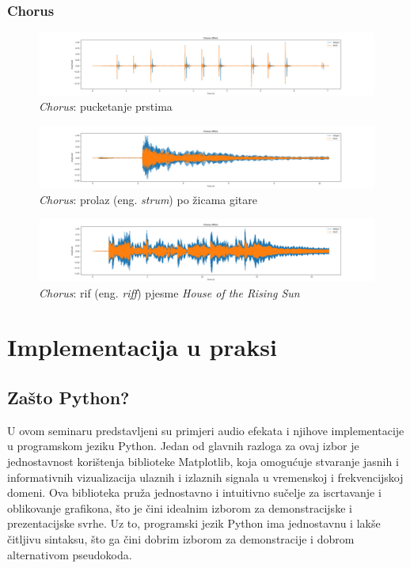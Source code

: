 \documentclass[times, utf8, seminar, numeric]{fer}
\begin{document}
\subsection{Chorus}
\begin{figure}[!htb]
	\centerline{\includegraphics[width=1.75\textwidth]{chorus_finger-snapping.png}}
	\caption{\textit{Chorus}: pucketanje prstima}
	\label{fig}
\end{figure}
\begin{figure}[!htb]
	\centerline{\includegraphics[width=1.75\textwidth]{chorus_strum.png}}
	\caption{\textit{Chorus}: prolaz (eng. \textit{strum}) po žicama gitare}
	\label{fig}
\end{figure}
\begin{figure}[!htb]
	\centerline{\includegraphics[width=1.75\textwidth]{chorus_rising-sun.png}}
	\caption{\textit{Chorus}: rif (eng. \textit{riff}) pjesme \textit{House of the Rising Sun}}
	\label{fig}
\end{figure}

\chapter{Implementacija u praksi}

\section{Zašto Python?}

U ovom seminaru predstavljeni su primjeri audio efekata i njihove implementacije u programskom jeziku Python. Jedan od glavnih razloga za ovaj izbor je jednostavnost korištenja biblioteke Matplotlib, koja omogućuje stvaranje jasnih i informativnih vizualizacija ulaznih i izlaznih signala u vremenskoj i frekvencijskoj domeni. Ova biblioteka pruža jednostavno i intuitivno sučelje za iscrtavanje i oblikovanje grafikona, što je čini idealnim izborom za demonstracijske i prezentacijske svrhe. Uz to, programski jezik Python ima jednostavnu i lakše čitljivu sintaksu, što ga čini dobrim izborom za demonstracije i dobrom alternativom pseudokoda.
\end{document}
